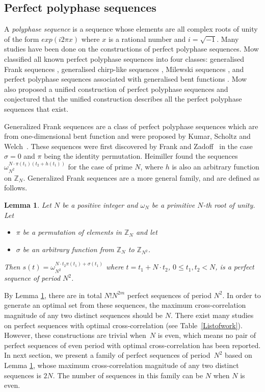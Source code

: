 \documentclass[conference,letterpaper]{IEEEtran}
\newtheorem{lemma}{Lemma}
\theoremstyle{definition}
\begin{document}
\subsection{Perfect polyphase sequences}
A \textit{polyphase sequence} is a sequence whose elements are  all complex roots of unity of the form $exp(i2\pi x)$ where $x$ is a rational number and $i = \sqrt{-1}$.  Many studies have been done on the constructions of perfect polyphase sequences.  Mow \cite{Mow} classified all known perfect polyphase sequences into four classes:  generalised Frank sequences \cite{Kumar},  generalised chirp-like sequences \cite{chirp-like},  Milewski sequences \cite{Milewski}, and  perfect polyphase sequences associated with generalised bent functions \cite{Chung}. Mow also proposed a unified construction of perfect polyphase sequences and conjectured that the unified construction describes all the perfect polyphase sequences that exist.


Generalized Frank sequences are a class of perfect polyphase sequences which are from one-dimensional bent function and were proposed by Kumar, Scholtz and Welch~\cite{Kumar}. These sequences  were first discovered by Frank and Zadoff~\cite{Frank} in the case $\sigma = 0$ and $\pi$ being the identity permutation.  Heimiller \cite{Heimiller}  found the sequences
$
\omega_{N^2}^{N\cdot \pi(t_{1}) ( t_{2} + h(t_{1}))}
$
for the case of prime $N$, where $h$ is also an arbitrary function on $\mathbb{Z}_{N}$. Generalized Frank sequences are a more general family, and are defined as follows. 


\begin{lemma} \cite{Kumar}\label{bent function}
Let $N$ be a positive integer and $\omega_N$ be a primitive  $N$-th root of unity. Let 
\begin{itemize}
\item[(i)] $\pi$ be a permutation of elements in  $\mathbb{Z}_{N}$ and let
\item[(ii)] $\sigma$ be an arbitrary function from  $\mathbb{Z}_{N}$ to  $\mathbb{Z}_{N^2}$.
\end{itemize}
Then $
s(t)= \omega_{N^2}^{N\cdot t_{2} \pi(t_{1}) + \sigma(t_{1})}
$
where $t=t_{1}+ N \cdot t_{2} $, $0 \leq t_{1}, t_{2} < N$, is a perfect sequence of period $N^2$.
\end{lemma} 



By Lemma \ref{bent function}, there are in total $N!N^{2m}$ perfect sequences of period $N^2$. In order to generate an optimal set from these sequences,  the maximum cross-correlation magnitude of any two distinct sequences  should be  $N$. There exist many studies on perfect sequences with optimal cross-correlation (see Table~\ref{Listofwork}). However, these constructions are trivial when~$N$ is even, which means no pair of perfect sequences of even period with optimal cross-correlation has been reported. In next section, we present a family of perfect sequences of period~$N^2$ based on Lemma \ref{bent function}, whose maximum cross-correlation magnitude of any two distinct sequences is $2N$.  The number of sequences in this family can be $N$ when $N$ is even.
\end{document}
